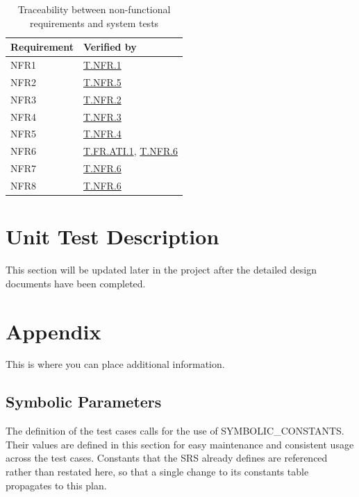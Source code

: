 \documentclass[12pt, titlepage]{article}
\begin{document}
\begin{table}[H]
\centering
\small
\renewcommand{\arraystretch}{1.2}
\caption{Traceability between non-functional requirements and system tests}
\label{tab:nfr-traceability}
\begin{tabularx}{\textwidth}{@{} l >{\raggedright\arraybackslash}X @{}}
\toprule
\textbf{Requirement} & \textbf{Verified by}\\
\midrule
NFR1 & \hyperref[test:T.NFR.1]{T.NFR.1}\\
NFR2 & \hyperref[test:T.NFR.5]{T.NFR.5}\\
NFR3 & \hyperref[test:T.NFR.2]{T.NFR.2}\\
NFR4 & \hyperref[test:T.NFR.3]{T.NFR.3}\\
NFR5 & \hyperref[test:T.NFR.4]{T.NFR.4}\\
NFR6 & \hyperref[test:T.FR.ATI.1]{T.FR.ATI.1}, \hyperref[test:T.NFR.6]{T.NFR.6}\\
NFR7 & \hyperref[test:T.NFR.6]{T.NFR.6}\\
NFR8 & \hyperref[test:T.NFR.6]{T.NFR.6}\\
\bottomrule
\end{tabularx}
\end{table}

\section{Unit Test Description}
This section will be updated later in the project after the detailed design documents have been completed.

				
\newpage





\newpage

\section{Appendix}

This is where you can place additional information.

\subsection{Symbolic Parameters}
\label{sec:symbolic-params}

The definition of the test cases calls for the use of SYMBOLIC\_CONSTANTS.
Their values are defined in this section for easy maintenance and consistent usage across the test cases.
Constants that the SRS \citep{SRS} already defines are referenced rather than restated here, so that a
single change to its constants table propagates to this plan.
\end{document}

